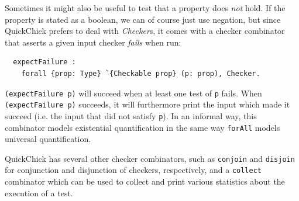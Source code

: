 \documentclass[twoside,11pt,openright]{report}
\newenvironment{code}{\captionsetup{type=figure, singlelinecheck=off, justification=raggedleft}}{}
\newcommand{\coq}[1]{\texttt{#1}}
\begin{document}
Sometimes it might also be useful to test that a property does \textit{not} hold. If the property is stated as a boolean, we can of course just use negation, but since QuickChick prefers to deal with \textit{Checker}s, it comes with a checker combinator that asserts a given input checker \textit{fails} when run:
\begin{code}
\label{def:expectFailure}
\begin{verbatim}
  expectFailure :
    forall {prop: Type} `{Checkable prop} (p: prop), Checker.
\end{verbatim}
\end{code}
\coq{(expectFailure p)} will succeed when at least one test of \coq{p} fails. When \coq{(expectFailure p)} succeeds, it will furthermore print the input which made it succeed (i.e. the input that did not satisfy \coq{p}). In an informal way, this combinator models existential quantification in the same way \coq{forAll} models universal quantification. 

QuickChick has several other checker combinators, such as \coq{conjoin} and \coq{disjoin} for conjunction and disjunction of checkers, respectively, and a \coq{collect} combinator which can be used to collect and print various statistics about the execution of a test.
\end{document}
